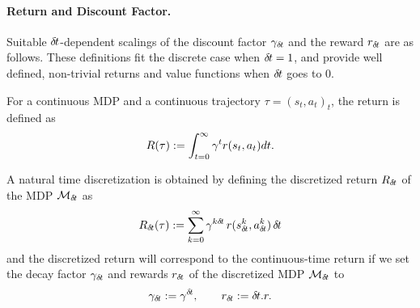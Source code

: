 



\paragraph{Return and Discount Factor.}
Suitable 
${\delta\hspace{-.1em}t}$-dependent scalings of the discount factor $\gamma_{\delta\hspace{-.1em}t}$
and the reward $r_{\delta\hspace{-.1em}t}$ are as follows. These definitions fit the discrete case
when ${\delta\hspace{-.1em}t}=1$, and provide well defined, non-trivial returns
and value functions when ${\delta\hspace{-.1em}t}$ goes to $0$.

For a continuous MDP and a continuous trajectory $\tau = (s_t, a_t)_t$,
the return is defined as~\cite{cont_rl}
\begin{equation}
\label{eq:continuous-return}
R(\tau) \mathrel{\mathop{:}}= \int_{t=0}^\infty\gamma^tr(s_t, a_t)dt.
\end{equation}

A natural time discretization is obtained  by defining the discretized
return $R_{\delta\hspace{-.1em}t}$ of the MDP $\mathcal{M}_{{\delta\hspace{-.1em}t}}$ as
\begin{equation}
\label{eq:discretized-return}
R_{\delta\hspace{-.1em}t}(\tau) \mathrel{\mathop{:}}= \sum_{k=0}^\infty\gamma^{k{\delta\hspace{-.1em}t}}\,
r(s_{\delta\hspace{-.1em}t}^k, a_{\delta\hspace{-.1em}t}^k)\,{\delta\hspace{-.1em}t}
\end{equation}
and the discretized return will correspond to the continuous-time return
if we set the decay factor $\gamma_{\delta\hspace{-.1em}t}$ and rewards $r_{\delta\hspace{-.1em}t}$ of
the discretized MDP ${\cal M}_{\delta\hspace{-.1em}t}$ to
\begin{align}
\label{eq:def-gamma}
\gamma_{\delta\hspace{-.1em}t} \mathrel{\mathop{:}}= \gamma^{\delta\hspace{-.1em}t},\qquad
r_{\delta\hspace{-.1em}t} \mathrel{\mathop{:}}= {\delta\hspace{-.1em}t} . r.
\end{align}


